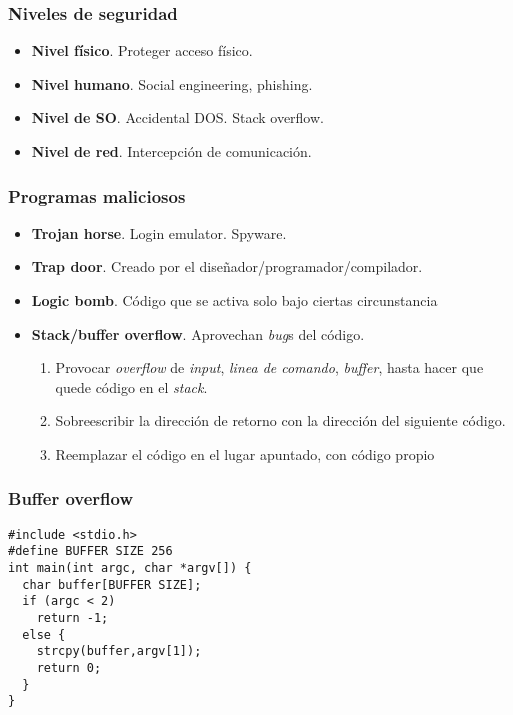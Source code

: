 \documentclass[letter]{beamer}
\begin{document}
\begin{frame}
  \frametitle{Niveles de seguridad}

  \begin{itemize}
    \item {\bf Nivel físico}. Proteger acceso físico.
    \item {\bf Nivel humano}. Social engineering, phishing.
    \item {\bf Nivel de SO}. Accidental DOS. Stack overflow.
    \item {\bf Nivel de red}. Intercepción de comunicación.
  \end{itemize}

\end{frame}
\begin{frame}
  \frametitle{Programas maliciosos}

  \begin{itemize}
    \item {\bf Trojan horse}. Login emulator. Spyware.
    \item {\bf Trap door}. Creado por el diseñador/programador/compilador.
    \item {\bf Logic bomb}. Código que se activa solo bajo ciertas circunstancia
    \item {\bf Stack/buffer overflow}. Aprovechan {\em bug}s del código.
      \begin{enumerate}
        \item Provocar {\em overflow} de {\em input}, {\em linea de comando}, {\em buffer},
              hasta hacer que quede código en el {\em stack}.
        \item Sobreescribir la dirección de retorno con la dirección del siguiente código.
        \item Reemplazar el código en el lugar apuntado, con código propio
      \end{enumerate}
  \end{itemize}
  
\end{frame}
\begin{frame}[fragile]
  \frametitle{Buffer overflow}
  
\begin{verbatim}
#include <stdio.h>
#define BUFFER SIZE 256
int main(int argc, char *argv[]) {
  char buffer[BUFFER SIZE];
  if (argc < 2)
    return -1;
  else { 
    strcpy(buffer,argv[1]); 
    return 0;
  }
}

\end{verbatim}
  
\end{frame}
\end{document}
